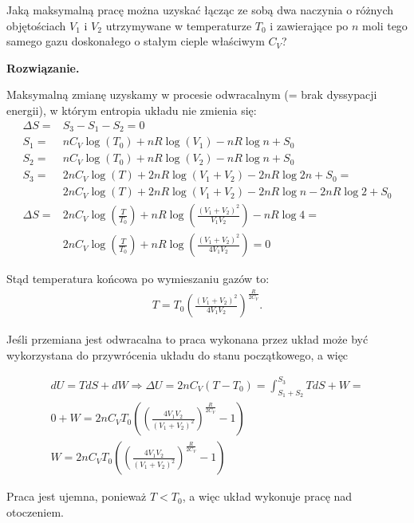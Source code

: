 \documentclass[11pt,a4paper]{article}
\newenvironment{solution}{\vspace{1cm} \par\textbf{Rozwiązanie.} \vspace{1cm}}{}
\begin{document}
Jaką maksymalną pracę można uzyskać łącząc ze sobą dwa naczynia o różnych objętościach $V_1$ i $V_2$
utrzymywane w temperaturze $T_0$ i zawierające po $n$ moli tego samego gazu doskonałego o stałym cieple właściwym $C_V$?

\begin{solution}

Maksymalną zmianę uzyskamy w procesie odwracalnym (= brak dyssypacji energii), 
w którym entropia układu nie zmienia się:
\begin{align*}
  \Delta S =&  S_3 - S_1 - S_2 = 0\\
  S_1 =& nC_{V} \log\left(T_0\right) + n R \log\left({V_1}\right) - nR\log n + S_0\\
  S_2 =& nC_{V} \log\left(T_0\right) + n R \log\left({V_2}\right) - nR\log n + S_0 \\
  S_3 =& 2 n C_V \log\left(T\right) + 2n R \log\left({V_1 + V_2}\right) - 2 nR\log 2n + S_0 = \\
  & 2 n C_V \log\left(T\right) + 2n R \log\left({V_1 + V_2}\right) - 2 nR\log n - 2nR\log 2 + S_0\\
  \Delta S =& 2n C_V \log\left(\frac{T}{T_0}\right) + 
  n R \log\left(\frac{(V_1 + V_2)^2}{V_1 V_2}\right) - nR\log 4 = \\
  & 2n C_V \log\left(\frac{T}{T_0}\right) + n R \log\left(\frac{(V_1 + V_2)^2}{4V_1 V_2}\right) = 0
\end{align*}

Stąd temperatura końcowa po wymieszaniu gazów to:
\begin{align*}
T = T_0 \left(\frac{(V_1 + V_2)^2}{4V_1 V_2}\right)^{\frac{R}{2 C_V}}.
\end{align*}

Jeśli przemiana jest odwracalna to praca wykonana przez układ może być wykorzystana 
do przywrócenia układu do stanu początkowego, a więc
 
\begin{align*}
dU = TdS + dW \Rightarrow 
\Delta U = 2n C_V (T - T_0) = \int_{S_1+ S_2}^{S_3} TdS + W = \\
0 + W = 
2n C_V T_0 \left(\left(\frac{4V_1 V_2}{(V_1 + V_2)^2}\right)^{\frac{R}{2 C_V}} - 1\right) \\
W = 2n C_V T_0 \left(\left(\frac{4V_1 V_2}{(V_1 + V_2)^2}\right)^{\frac{R}{2 C_V}} - 1\right)
\end{align*}

Praca jest ujemna, ponieważ $T < T_0$, a więc układ wykonuje pracę nad otoczeniem.

\newpage
\end{solution}
\end{document}

